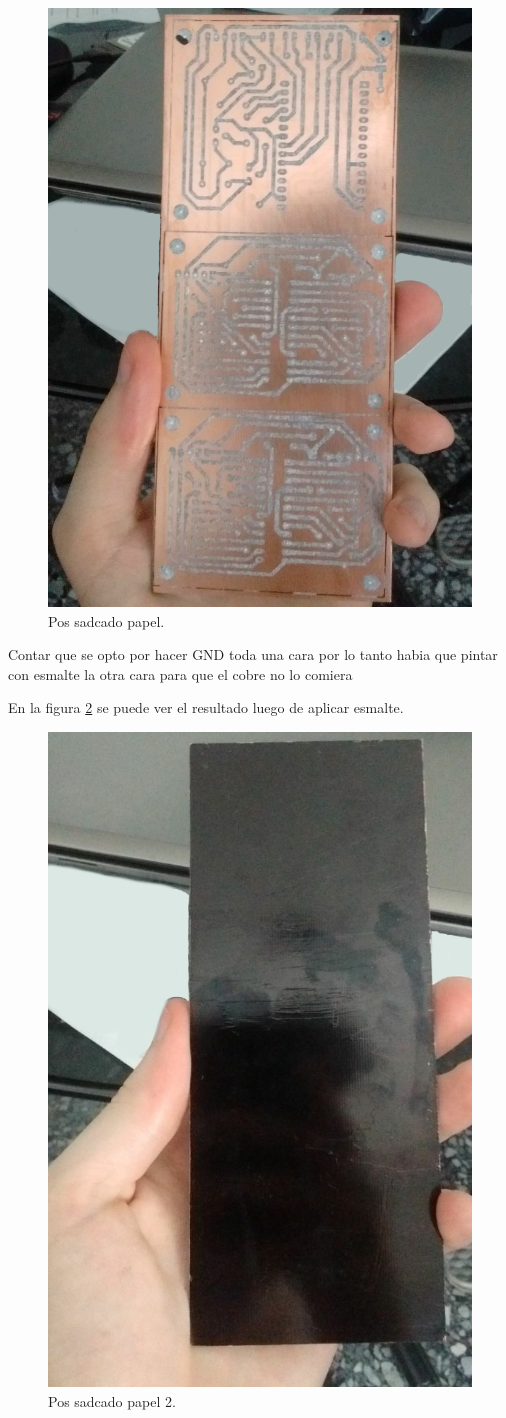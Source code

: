\begin{figure}[ht!]
	\centering
	\includegraphics[width=0.47\linewidth]{imagenes/pcbeando/pos-sacado-pape-1.png}
	\caption{Pos sadcado papel.}
	\label{fig:pos-sacado-papel-1}
\end{figure}

{ \color{red} Contar que se opto por hacer GND toda una cara por lo tanto habia que pintar con esmalte la otra cara para que el cobre no lo comiera }

En la figura \ref{fig:pos-sacado-papel-2} se puede ver el resultado luego de aplicar esmalte.

\begin{figure}[ht!]
	\centering
	\includegraphics[width=0.47\linewidth]{imagenes/pcbeando/pos-sacado-papel-2.png}
	\caption{Pos sadcado papel 2.}
	\label{fig:pos-sacado-papel-2}
\end{figure}

